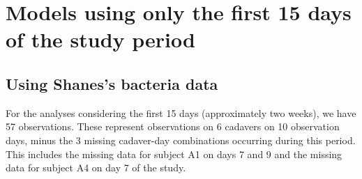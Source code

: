 \documentclass{article}
\begin{document}
\section{Models using only the first 15 days of the study period}

\subsection{Using Shanes's bacteria data}

For the analyses considering the first 15 days (approximately two
weeks), we have 57 observations.  These represent observations on 6
cadavers on 10 observation days, minus the 3 missing cadaver-day
combinations occurring during this period.  This includes the missing
data for subject A1 on days 7 and 9 and the missing data for subject
A4 on day 7 of the study.
\end{document}

